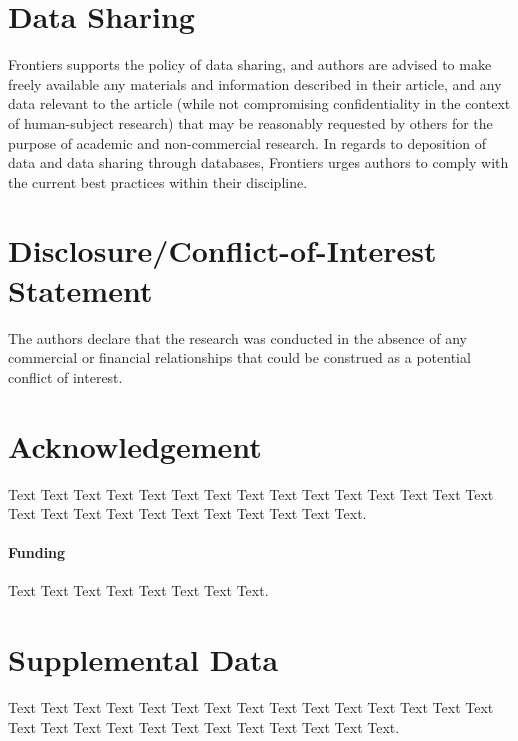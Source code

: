 \documentclass{frontiersSCNS} %
\begin{document}
\section{Data Sharing}

Frontiers supports the policy of data sharing, and authors are advised to make
freely available any materials and information described in their article, and
any data relevant to the article (while not compromising confidentiality in the
context of human-subject research) that may be reasonably requested by others
for the purpose of academic and non-commercial research. In regards to
deposition of data and data sharing through databases, Frontiers urges authors
to comply with the current best practices within their discipline.

\section*{Disclosure/Conflict-of-Interest Statement}
The authors declare that the research was conducted in the absence of any
commercial or financial relationships that could be construed as a potential
conflict of interest.

\section*{Acknowledgement} Text Text Text Text Text Text  Text Text Text Text
Text Text Text Text  Text Text Text Text Text Text Text Text Text  Text Text
Text.

\paragraph{Funding\textcolon} Text Text Text Text Text Text  Text Text.

\section*{Supplemental Data} Text Text Text Text Text Text  Text Text Text Text
Text Text Text Text Text  Text Text Text Text Text Text Text Text Text  Text
Text Text.


\end{document}
